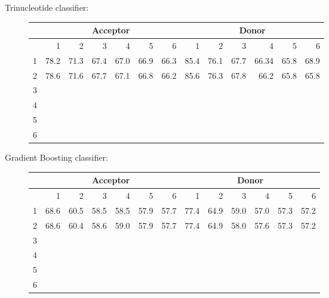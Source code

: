\documentclass[10pt]{beamer}
\begin{document}
\begin{frame}
	Trinucleotide classifier:
	\begin{figure}
		\scriptsize
		\begingroup
		\centering
		\def\arraystretch{1.1}
		\begin{tabular}{|r|r|r|r|r|r|r|r|r|r|r|r|r|}
			\hline
			&\multicolumn{6}{c}{Acceptor}&\multicolumn{6}{|c|}{Donor}\\
			\hline
			&1&2&3&4&5&6&1&2&3&4&5&6\\
			\hline
			1&78.2&71.3&67.4&67.0&66.9&66.3&85.4&76.1&67.7&66.34&65.8&68.9\\
			2&78.6&71.6&67.7&67.1&66.8&66.2&85.6&76.3&67.8&66.2&65.8&65.8\\
			3&&&&&&&&&&&&\\
			4&&&&&&&&&&&&\\
			5&&&&&&&&&&&&\\
			6&&&&&&&&&&&&\\
			
			\hline 
		\end{tabular}
		\endgroup	
	\end{figure}

	Gradient Boosting classifier:
	\begin{figure}
		\scriptsize
		\begingroup
		\centering
		\def\arraystretch{1.1}
		\begin{tabular}{|r|r|r|r|r|r|r|r|r|r|r|r|r|}
			\hline
			&\multicolumn{6}{c}{Acceptor}&\multicolumn{6}{|c|}{Donor}\\
			\hline
			&1&2&3&4&5&6&1&2&3&4&5&6\\
			\hline
			1&68.6&60.5&58.5&58.5&57.9&57.7&77.4&64.9&59.0&57.0&57.3&57.2\\
			2&68.6&60.4&58.6&59.0&57.9&57.7&77.4&64.9&58.0&57.6&57.3&57.2\\
			3&&&&&&&&&&&&\\
			4&&&&&&&&&&&&\\
			5&&&&&&&&&&&&\\
			6&&&&&&&&&&&&\\
			
			\hline 
		\end{tabular}
		\endgroup	
	\end{figure}
\end{frame}
\end{document}
